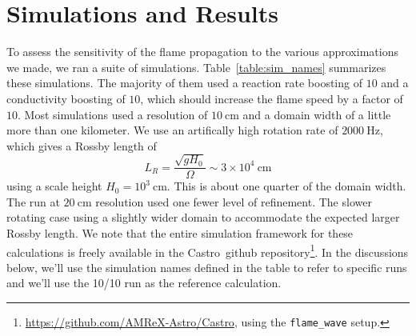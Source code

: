 \documentclass[preprint,times,tighten]{aastex63}
\newcommand{\castro}{{\sf Castro}}
\begin{document}
\section{Simulations and Results}\label{Sec:results}

To assess the sensitivity of the flame propagation to the various approximations
we made, we ran a suite of simulations. 
Table~\ref{table:sim_names} summarizes these simulations.
The majority of them used a reaction rate boosting of $10$ and a
conductivity boosting of $10$, which should increase the flame speed
by a factor of $10$.  Most simulations used a resolution of
$10~\mbox{cm}$ and a domain width of a little more than one kilometer.  
We use an artifically high rotation rate of
$2000~\mbox{Hz}$, which gives a Rossby length of
\begin{equation}
L_R = \frac{\sqrt{g H_0}}{\Omega} \sim 3\times 10^4~\mathrm{cm}
\end{equation}
using a scale height $H_0 = 10^3~\mathrm{cm}$.  This is about one
quarter of the domain width.  The run at $20~\mbox{cm}$ resolution used
one fewer level of refinement.  The slower rotating case using a
slightly wider domain to accommodate the expected larger Rossby
length.  We note that the entire simulation framework for these
calculations is freely available in the \castro\ github
repository\footnote{\url{https://github.com/AMReX-Astro/Castro}, using
  the {\tt flame\_wave} setup.}.  In the discussions below, we'll use
the simulation names defined in the table to refer to specific runs
and we'll use the 10/10 run as the reference calculation.
\end{document}

